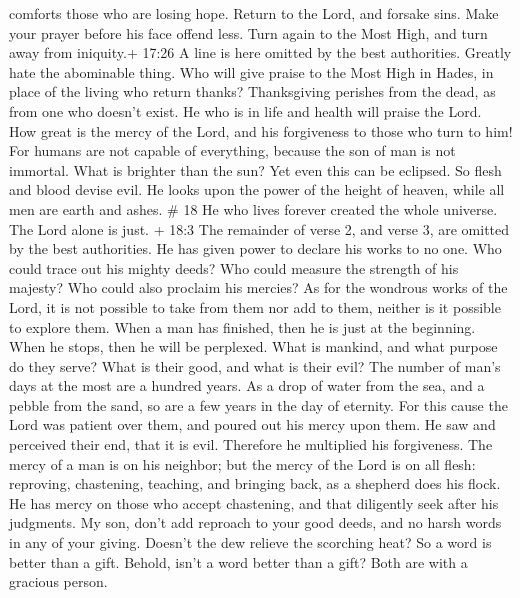 comforts those who are losing hope.  Return to the Lord,
and forsake sins. Make your prayer before his face offend less.
 Turn again to the Most High, and turn away from iniquity.+
17:26 A line is here omitted by the best authorities. Greatly hate the
abominable thing.  Who will give praise to the Most High in
Hades, in place of the living who return thanks? 
Thanksgiving perishes from the dead, as from one who doesn't exist. He
who is in life and health will praise the Lord.  How great
is the mercy of the Lord, and his forgiveness to those who turn to him!
 For humans are not capable of everything, because the son
of man is not immortal.  What is brighter than the sun? Yet
even this can be eclipsed. So flesh and blood devise evil. 
He looks upon the power of the height of heaven, while all men are earth
and ashes. \# 18  He who lives forever created the whole
universe.  The Lord alone is just.  + 18:3 The
remainder of verse 2, and verse 3, are omitted by the best authorities.
 He has given power to declare his works to no one. Who
could trace out his mighty deeds?  Who could measure the
strength of his majesty? Who could also proclaim his mercies?
 As for the wondrous works of the Lord, it is not possible
to take from them nor add to them, neither is it possible to explore
them.  When a man has finished, then he is just at the
beginning. When he stops, then he will be perplexed.  What
is mankind, and what purpose do they serve? What is their good, and what
is their evil?  The number of man's days at the most are a
hundred years.  As a drop of water from the sea, and a
pebble from the sand, so are a few years in the day of eternity.
 For this cause the Lord was patient over them, and poured
out his mercy upon them.  He saw and perceived their end,
that it is evil. Therefore he multiplied his forgiveness. 
The mercy of a man is on his neighbor; but the mercy of the Lord is on
all flesh: reproving, chastening, teaching, and bringing back, as a
shepherd does his flock.  He has mercy on those who accept
chastening, and that diligently seek after his judgments. 
My son, don't add reproach to your good deeds, and no harsh words in any
of your giving.  Doesn't the dew relieve the scorching
heat? So a word is better than a gift.  Behold, isn't a
word better than a gift? Both are with a gracious person. 

